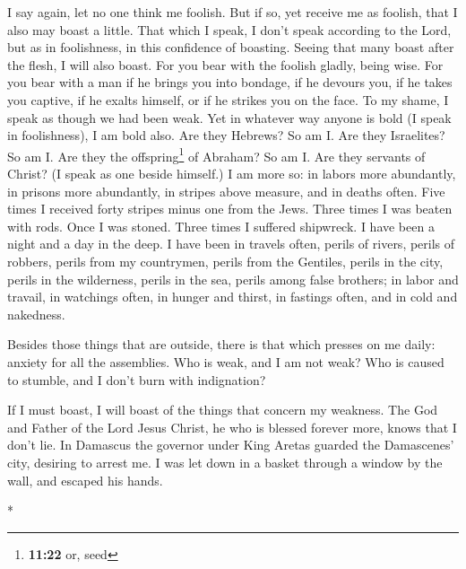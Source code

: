 \begin{paracol}{2}
\begin{otherlanguage}{english}
 I say again, let no one think me foolish. But if so, yet
receive me as foolish, that I also may boast a little. 
That which I speak, I don't speak according to the Lord, but as in
foolishness, in this confidence of boasting.  Seeing that
many boast after the flesh, I will also boast.  For you
bear with the foolish gladly, being wise.  For you bear
with a man if he brings you into bondage, if he devours you, if he takes
you captive, if he exalts himself, or if he strikes you on the face.
 To my shame, I speak as though we had been weak. Yet in
whatever way anyone is bold (I speak in foolishness), I am bold also.
 Are they Hebrews? So am I. Are they Israelites? So am I.
Are they the offspring\footnote{\textbf{11:22} or, seed} of Abraham? So
am I.  Are they servants of Christ? (I speak as one
beside himself.) I am more so: in labors more abundantly, in prisons
more abundantly, in stripes above measure, and in deaths often.
 Five times I received forty stripes minus one from the
Jews.  Three times I was beaten with rods. Once I was
stoned. Three times I suffered shipwreck. I have been a night and a day
in the deep.  I have been in travels often, perils of
rivers, perils of robbers, perils from my countrymen, perils from the
Gentiles, perils in the city, perils in the wilderness, perils in the
sea, perils among false brothers;  in labor and travail,
in watchings often, in hunger and thirst, in fastings often, and in cold
and nakedness.

 Besides those things that are outside, there is that
which presses on me daily: anxiety for all the assemblies.
 Who is weak, and I am not weak? Who is caused to
stumble, and I don't burn with indignation?

 If I must boast, I will boast of the things that concern
my weakness.  The God and Father of the Lord Jesus
Christ, he who is blessed forever more, knows that I don't lie.
 In Damascus the governor under King Aretas guarded the
Damascenes' city, desiring to arrest me.  I was let down
in a basket through a window by the wall, and escaped his hands.

\end{otherlanguage}

\switchcolumn[0]*

\hypertarget{el-apuxf3stol-se-jacta-de-las-muxe1s-altas-gracias-a-travuxe9s-de-revelaciones-celestiales-y-la-muxe1s-profunda-humillaciuxf3n-a-travuxe9s-del-sufrimiento-fuxedsico}{%
}
\end{paracol}
